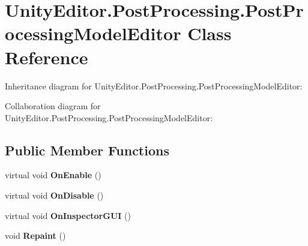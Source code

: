 \hypertarget{class_unity_editor_1_1_post_processing_1_1_post_processing_model_editor}{}\section{Unity\+Editor.\+Post\+Processing.\+Post\+Processing\+Model\+Editor Class Reference}
\label{class_unity_editor_1_1_post_processing_1_1_post_processing_model_editor}


Inheritance diagram for Unity\+Editor.\+Post\+Processing.\+Post\+Processing\+Model\+Editor\+:


Collaboration diagram for Unity\+Editor.\+Post\+Processing.\+Post\+Processing\+Model\+Editor\+:
\subsection*{Public Member Functions}
\begin{DoxyCompactItemize}
\item 
\mbox{\label{class_unity_editor_1_1_post_processing_1_1_post_processing_model_editor_afc8898be3e15186a93a79ec38739988c}} 
virtual void {\bfseries On\+Enable} ()
\item 
\mbox{\label{class_unity_editor_1_1_post_processing_1_1_post_processing_model_editor_a65506dbbea144f02d2c0f90fa016a4f8}} 
virtual void {\bfseries On\+Disable} ()
\item 
\mbox{\label{class_unity_editor_1_1_post_processing_1_1_post_processing_model_editor_a925d6beb73dfef3d52311a08027d5850}} 
virtual void {\bfseries On\+Inspector\+G\+UI} ()
\item 
\mbox{\label{class_unity_editor_1_1_post_processing_1_1_post_processing_model_editor_a3309ef89e31c184e80444ddf0bef8b86}} 
void {\bfseries Repaint} ()
\end{DoxyCompactItemize}
